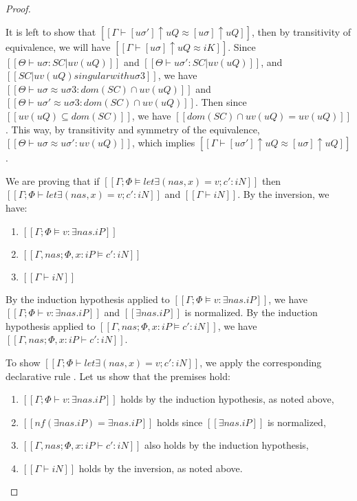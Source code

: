 \begin{proof}
\begin{caseof}
\begin{itemize}
                    It is left to show that $[[Γ ⊢ [uσ']↑uQ ≈ [uσ]↑uQ]]$, 
                    then by transitivity of equivalence, we will have $[[Γ ⊢ [uσ]↑uQ ≈ iK]]$.
                    Since $[[ Θ  ⊢ uσ : SC|uv(uQ) ]]$ and $[[ Θ  ⊢ uσ' : SC|uv(uQ) ]]$, 
                    and $[[SC|uv(uQ) singular with uσ3]]$, we have 
                    $[[Θ ⊢ uσ ≈ uσ3 : dom(SC) ∩ uv(uQ)]]$
                    and $[[Θ ⊢ uσ' ≈ uσ3 : dom(SC) ∩ uv(uQ)]]$.
                    Then since $[[uv(uQ) ⊆ dom(SC)]]$, we have $[[dom(SC) ∩ uv(uQ) = uv(uQ)]]$.
                    This way, by transitivity and symmetry of the equivalence, 
                    $[[Θ ⊢ uσ ≈ uσ' : uv(uQ)]]$, which implies
                    $[[Γ ⊢ [uσ']↑uQ ≈ [uσ]↑uQ]]$. 
            \end{itemize}

        \item {}
            We are proving that if 
            $[[Γ; Φ ⊨ let∃ (nas, x) = v; c' : iN]]$
            then
            $[[Γ ; Φ ⊢ let∃ (nas, x) = v; c' : iN]]$ and
            $[[Γ ⊢ iN]]$.
            By the inversion, we have:
            \begin{enumerate}
                \item $[[Γ; Φ ⊨ v : ∃nas.iP]]$
                \item $[[Γ, nas ; Φ, x:iP ⊨ c' : iN]]$
                \item $[[Γ ⊢ iN]]$
            \end{enumerate}

            By the induction hypothesis applied to 
            $[[Γ; Φ ⊨ v : ∃nas.iP]]$, we have $[[Γ; Φ ⊢ v : ∃nas.iP]]$
            and $[[∃nas.iP]]$ is normalized.
            By the induction hypothesis applied to
            $[[Γ, nas ; Φ, x:iP ⊨ c' : iN]]$, we have $[[Γ, nas ; Φ, x:iP ⊢ c' : iN]]$.

            To show $[[Γ; Φ ⊢ let∃ (nas, x) = v; c' : iN]]$, we apply the corresponding
            declarative rule . Let us show that the premises hold:
            \begin{enumerate}
                \item $[[Γ ; Φ ⊢ v : ∃nas.iP]]$ holds by the induction hypothesis, as noted above,
                \item $[[nf(∃nas.iP) = ∃nas.iP]]$ holds since $[[∃nas.iP]]$ is normalized,
                \item $[[Γ, nas ; Φ, x:iP ⊢ c' : iN]]$ also holds by the induction hypothesis,
                \item $[[Γ ⊢ iN]]$ holds by the inversion, as noted above.
            \end{enumerate}


\end{caseof}
\end{proof}
